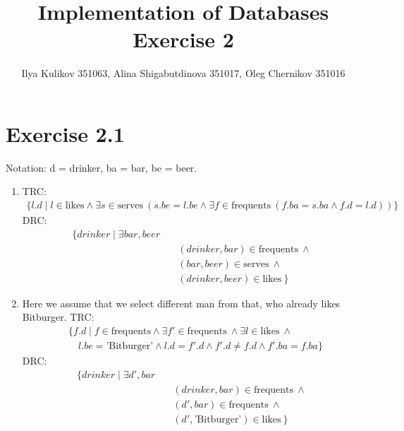 \documentclass[10pt]{article}
\title{Implementation of Databases Exercise 2}
\author{Ilya Kulikov 351063, Alina Shigabutdinova 351017, Oleg Chernikov 351016}
\begin{document}
  \maketitle
  \section*{Exercise 2.1}
  	Notation: d = drinker, ba = bar, be = beer.
  \begin{enumerate}[label=\arabic*.]
      \item
      TRC:
      \begin{equation*}
      \begin{split}
        \{l.d \mid l \in \text{likes} \wedge \exists s \in \text{serves}\ (s.be = l.be \wedge \exists f \in \text{frequents}\ (f.ba = s.ba \wedge f.d = l.d))\}
      \end{split}
      \end{equation*}
      DRC:
      \begin{equation*}
      \begin{split}
      	\{drinker \mid \exists bar, beer \\
        &\quad (drinker, bar) \in \text{frequents}\ \wedge\\
        &\quad (bar, beer) \in \text{serves}\ \wedge\\
		&\quad (drinker, beer) \in \text{likes}\ \}
      \end{split}
      \end{equation*}

      \item
      Here we assume that we select different man from that, who already likes Bitburger.
      TRC:
      \begin{equation*}
      \begin{split}
        &\{f.d \mid f \in \text{frequents} \wedge \exists f' \in \text{frequents}\ \wedge \exists l \in \text{likes}\ \wedge \\
        &\quad l.be = \text{'Bitburger'} \wedge l.d = f'.d \wedge f'.d \neq f.d \wedge f'.ba = f.ba\}
      \end{split}
      \end{equation*}
      DRC:
      \begin{equation*}
      \begin{split}
      	\{drinker \mid \exists d',bar \\
        &\quad (drinker, bar) \in \text{frequents}\ \wedge\\
        &\quad (d', bar) \in \text{frequents}\ \wedge\\
		&\quad (d', \text{'Bitburger'}) \in \text{likes}\ \}
      \end{split}
      \end{equation*}


\end{enumerate}
\end{document}
